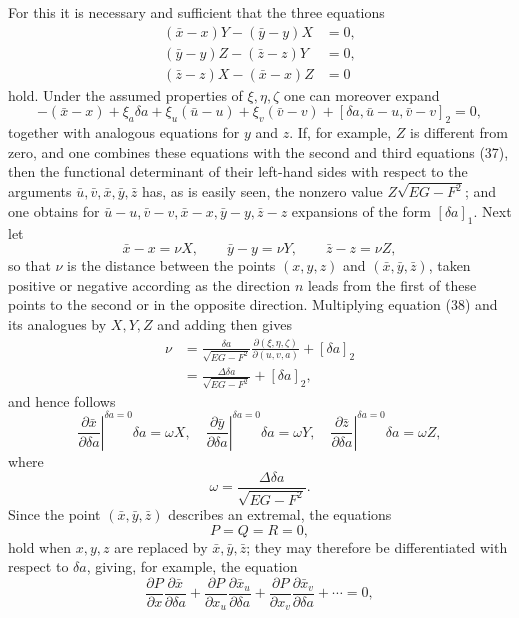 \documentclass[11pt,a4paper,leqno]{article}
\begin{document}
For this it is necessary and sufficient that the three equations
\begin{equation}\tag{37}
\begin{aligned}
(\bar x-x)Y-(\bar y-y)X&=0,\\
(\bar y-y)Z-(\bar z-z)Y&=0,\\
(\bar z-z)X-(\bar x-x)Z&=0
\end{aligned}
\end{equation}
hold. Under the assumed properties of $\xi,\eta,\zeta$ one can moreover
expand
\begin{equation}\tag{38}
-(\bar x-x)+\xi_a\delta a+\xi_u(\bar u-u)+\xi_v(\bar v-v)
+[\delta a,\bar u-u,\bar v-v]_2=0,
\end{equation}
together with analogous equations for $y$ and $z$. If, for example, $Z$ is
different from zero, and one combines these equations with the second and
third equations (37), then the functional determinant of their left-hand
sides with respect to the arguments
$\bar u,\bar v,\bar x,\bar y,\bar z$ has, as is easily seen, the nonzero
value $Z\sqrt{EG-F^2}$; and one obtains for
$\bar u-u,\bar v-v,\bar x-x,\bar y-y,\bar z-z$ expansions of the form
$[\delta a]_1$. Next let
\[
\bar x-x=\nu X,\qquad \bar y-y=\nu Y,\qquad \bar z-z=\nu Z,
\]
so that $\nu$ is the distance between the points $(x,y,z)$ and
$(\bar x,\bar y,\bar z)$, taken positive or negative according as the
direction $n$ leads from the first of these points to the second or in the
opposite direction. Multiplying equation (38) and its analogues by $X,Y,Z$
and adding then gives
\[
\begin{aligned}
\nu
&=\frac{\delta a}{\sqrt{EG-F^2}}
\frac{\partial(\xi,\eta,\zeta)}{\partial(u,v,a)}+[\delta a]_2\\
&=\frac{\Delta\delta a}{\sqrt{EG-F^2}}+[\delta a]_2,
\end{aligned}
\]
and hence follows
\begin{equation}\tag{39}
\left.\frac{\partial\bar x}{\partial\delta a}\right|^{\delta a=0}
\delta a=\omega X,\quad
\left.\frac{\partial\bar y}{\partial\delta a}\right|^{\delta a=0}
\delta a=\omega Y,\quad
\left.\frac{\partial\bar z}{\partial\delta a}\right|^{\delta a=0}
\delta a=\omega Z,
\end{equation}
where
\begin{equation}\tag{40}
\omega=\frac{\Delta\delta a}{\sqrt{EG-F^2}}.
\end{equation}
Since the point $(\bar x,\bar y,\bar z)$ describes an extremal, the equations
\[
P=Q=R=0,
\]
hold when $x,y,z$ are replaced by $\bar x,\bar y,\bar z$; they may therefore
be differentiated with respect to $\delta a$, giving, for example, the
equation
\begin{equation}\tag{41}
\frac{\partial P}{\partial x}\frac{\partial\bar x}{\partial\delta a}
+\frac{\partial P}{\partial x_u}\frac{\partial\bar x_u}{\partial\delta a}
+\frac{\partial P}{\partial x_v}\frac{\partial\bar x_v}{\partial\delta a}
+\cdots=0,
\end{equation}
\end{document}
